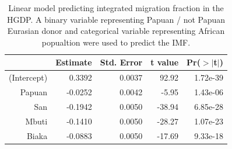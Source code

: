 \documentclass{article}
\begin{document}
\begin{table}[ht]
\centering
\begin{tabular}{rrrrr}
  \hline
 & Estimate & Std. Error & t value & Pr($>$$|$t$|$) \\ 
  \hline
(Intercept) & 0.3392 & 0.0037 & 92.92 & 1.72e-39 \\ 
  Papuan & -0.0252 & 0.0042 & -5.95 & 1.43e-06 \\ 
  San & -0.1942 & 0.0050 & -38.94 & 6.85e-28 \\ 
  Mbuti & -0.1410 & 0.0050 & -28.27 & 1.07e-23 \\ 
  Biaka & -0.0883 & 0.0050 & -17.69 & 9.33e-18 \\ 
   \hline
\end{tabular}
\caption{Linear model predicting integrated migration fraction in the HGDP. A binary variable representing Papuan / not Papuan Eurasian donor and categorical variable representing African popualtion were used to predict the IMF.} 
\label{hgdp:papuan_imf}
\end{table}
\end{document}
